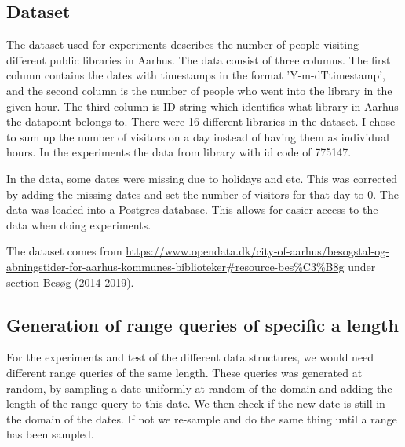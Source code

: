 \documentclass[11pt]{article}
\theoremstyle{definition}
\begin{document}
\subsection{Dataset}
The dataset used for experiments describes the number of people visiting different public libraries in Aarhus. The data consist of three columns. The first column contains the dates with timestamps in the format 'Y-m-dTtimestamp', and the second column is the number of people who went into the library in the given hour. The third column is ID string which identifies what library in Aarhus the datapoint belongs to. There were 16 different libraries in the dataset. I chose to sum up the number of visitors on a day instead of having them as individual hours. In the experiments the data from library with id code of 775147.

In the data, some dates were missing due to holidays and etc. This was corrected by adding the missing dates and set the number of visitors for that day to $0$.  The data was loaded into a Postgres database. This allows for easier access to the data when doing experiments. 

The dataset comes from \url{https://www.opendata.dk/city-of-aarhus/besogstal-og-abningstider-for-aarhus-kommunes-biblioteker#resource-bes\%C3\%B8g} under section Besøg (2014-2019).

\subsection{Generation of range queries of specific a length}
For the experiments and test of the different data structures, we would need different range queries of the same length. These queries was generated at random, by sampling a date uniformly at random of the domain and adding the length of the range query to this date. We then check if the new date is still in the domain of the dates. If not we re-sample and do the same thing until a range has been sampled.  
\end{document}
